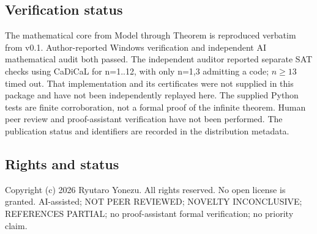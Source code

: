 \documentclass[
]{article}
\begin{document}
\subsection{Verification status}\label{verification-status}

The mathematical core from Model through Theorem is reproduced verbatim
from v0.1. Author-reported Windows verification and independent AI
mathematical audit both passed. The independent auditor reported
separate SAT checks using CaDiCaL for n=1..12, with only n=1,3 admitting
a code; \(n\geq 13\) timed out. That implementation and its certificates
were not supplied in this package and have not been independently
replayed here. The supplied Python tests are finite corroboration, not a
formal proof of the infinite theorem. Human peer review and
proof-assistant verification have not been performed. The publication
status and identifiers are recorded in the distribution metadata.

\subsection{Rights and status}\label{rights-and-status}

Copyright (c) 2026 Ryutaro Yonezu. All rights reserved. No open license
is granted. AI-assisted; NOT PEER REVIEWED; NOVELTY INCONCLUSIVE;
REFERENCES PARTIAL; no proof-assistant formal verification; no priority
claim.
\end{document}
